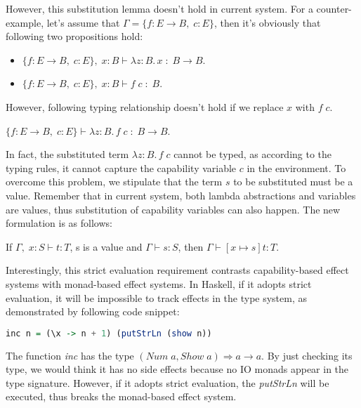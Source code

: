 However, this substitution lemma doesn't hold in current system. For a
counter-example, let's assume that $\Gamma = \{f: E \to B,\;
  c:E\}$, then it's obviously that following two propositions hold:

\begin{itemize}
\item $\{f: E \to B,\; c:E\},\; x:B \vdash \lambda z:B.\,x \; : \; B \to B$.
\item $\{f: E \to B,\; c:E\},\; x:B \vdash f \; c \; : \; B$.
\end{itemize}

However, following typing relationship doesn't hold if we replace
$x$ with $f \; c$.

\begin{center}
$\{f: E \to B,\; c:E\} \vdash \lambda z:B.\,f \; c \; : \; B \to B$.
\end{center}

In fact, the substituted term $\lambda z:B.\,f \; c$ cannot be typed,
as according to the typing rules, it cannot capture the capability
variable $c$ in the environment. To overcome this problem, we
stipulate that the term $s$ to be substituted must be a
value. Remember that in current system, both lambda abstractions and
variables are values, thus substitution of capability variables can
also happen. The new formulation is as follows:

\begin{lemma}
  If $\Gamma,\; x:S \vdash t : T$, s is a value and
  $\Gamma \vdash s : S$, then $\Gamma \vdash [x \mapsto s]t : T$.
\end{lemma}

Interestingly, this strict evaluation requirement contrasts
capability-based effect systems with monad-based effect systems. In
Haskell, if it adopts strict evaluation, it will be impossible to track
effects in the type system, as demonstrated by following code snippet:

\begin{lstlisting}[language=Haskell]
  inc n = (\x -> n + 1) (putStrLn (show n))
\end{lstlisting}

The function \emph{inc} has the type $(Num\;a, Show\;a) \Rightarrow a
\to a$. By just checking its type, we would think it has no side
effects because no IO monads appear in the type signature. However, if
it adopts strict evaluation, the \emph{putStrLn} will be executed, thus
breaks the monad-based effect system.

